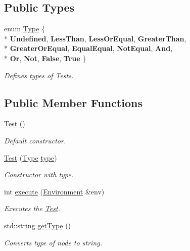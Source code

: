 \subsection*{Public Types}
\begin{DoxyCompactItemize}
\item 
\hypertarget{classTest_a9e5d00cf02fb05573a6f97d14ebc154a}{}enum \hyperlink{classTest_a9e5d00cf02fb05573a6f97d14ebc154a}{Type} \{ \\*
{\bfseries Undefined}, 
{\bfseries Less\+Than}, 
{\bfseries Less\+Or\+Equal}, 
{\bfseries Greater\+Than}, 
\\*
{\bfseries Greater\+Or\+Equal}, 
{\bfseries Equal\+Equal}, 
{\bfseries Not\+Equal}, 
{\bfseries And}, 
\\*
{\bfseries Or}, 
{\bfseries Not}, 
{\bfseries False}, 
{\bfseries True}
 \}\label{classTest_a9e5d00cf02fb05573a6f97d14ebc154a}

\begin{DoxyCompactList}\small\item\em Defines types of Tests. \end{DoxyCompactList}\end{DoxyCompactItemize}
\subsection*{Public Member Functions}
\begin{DoxyCompactItemize}
\item 
\hypertarget{classTest_a99f2bbfac6c95612322b0f10e607ebe5}{}\hyperlink{classTest_a99f2bbfac6c95612322b0f10e607ebe5}{Test} ()\label{classTest_a99f2bbfac6c95612322b0f10e607ebe5}

\begin{DoxyCompactList}\small\item\em Default constructor. \end{DoxyCompactList}\item 
\hyperlink{classTest_aefafe8c714d1bbd89f09daf43793b465}{Test} (\hyperlink{classTest_a9e5d00cf02fb05573a6f97d14ebc154a}{Type} \hyperlink{classTest_add1faa7d527f515b973350d566772265}{type})
\begin{DoxyCompactList}\small\item\em Constructor with type. \end{DoxyCompactList}\item 
int \hyperlink{classTest_a579d613526a8fc37c15b461e2f07e65e}{execute} (\hyperlink{classEnvironment}{Environment} \&env)
\begin{DoxyCompactList}\small\item\em Executes the \hyperlink{classTest}{Test}. \end{DoxyCompactList}\item 
std\+::string \hyperlink{classTest_adeefe4160992fad5d3a52584f69a420d}{get\+Type} ()
\begin{DoxyCompactList}\small\item\em Converts type of node to string. \end{DoxyCompactList}\end{DoxyCompactItemize}
